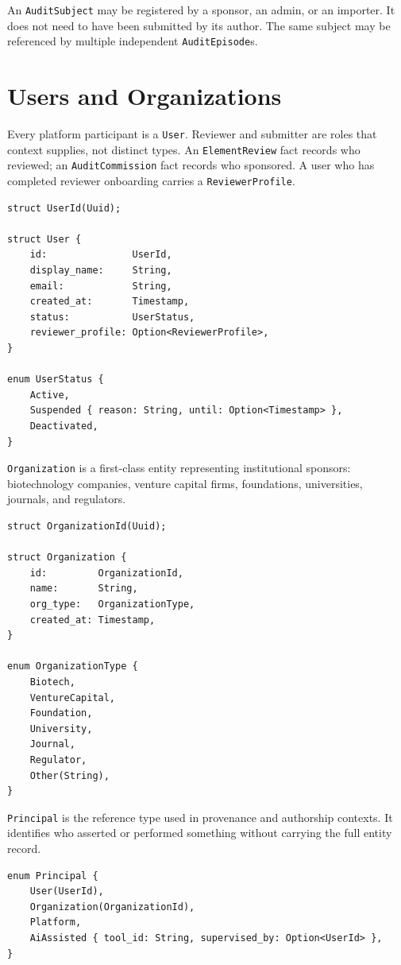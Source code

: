 \documentclass[11pt]{article}
\begin{document}
An \texttt{AuditSubject} may be registered by a sponsor, an admin, or an
importer. It does not need to have been submitted by its author. The same
subject may be referenced by multiple independent \texttt{AuditEpisode}s.

\section{Users and Organizations}

Every platform participant is a \texttt{User}. Reviewer and submitter are roles
that context supplies, not distinct types. An \texttt{ElementReview} fact records
who reviewed; an \texttt{AuditCommission} fact records who sponsored. A user who
has completed reviewer onboarding carries a \texttt{ReviewerProfile}.

\begin{lstlisting}
struct UserId(Uuid);

struct User {
    id:               UserId,
    display_name:     String,
    email:            String,
    created_at:       Timestamp,
    status:           UserStatus,
    reviewer_profile: Option<ReviewerProfile>,
}

enum UserStatus {
    Active,
    Suspended { reason: String, until: Option<Timestamp> },
    Deactivated,
}
\end{lstlisting}

\texttt{Organization} is a first-class entity representing institutional
sponsors: biotechnology companies, venture capital firms, foundations,
universities, journals, and regulators.

\begin{lstlisting}
struct OrganizationId(Uuid);

struct Organization {
    id:         OrganizationId,
    name:       String,
    org_type:   OrganizationType,
    created_at: Timestamp,
}

enum OrganizationType {
    Biotech,
    VentureCapital,
    Foundation,
    University,
    Journal,
    Regulator,
    Other(String),
}
\end{lstlisting}

\texttt{Principal} is the reference type used in provenance and authorship
contexts. It identifies who asserted or performed something without carrying
the full entity record.

\begin{lstlisting}
enum Principal {
    User(UserId),
    Organization(OrganizationId),
    Platform,
    AiAssisted { tool_id: String, supervised_by: Option<UserId> },
}
\end{lstlisting}
\end{document}
